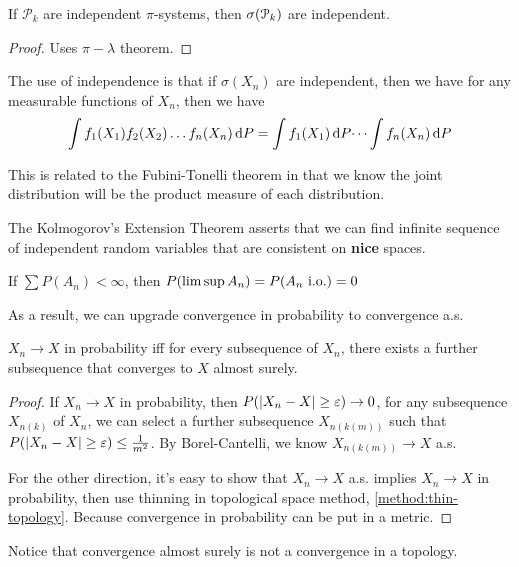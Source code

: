 \begin{thm}
    If \(\mathcal{P}_{k}\) are independent \(\pi\)-systems, then \(\sigma\pqty{\mathcal{P}_{k}}\) are independent. 
\end{thm}

\begin{proof}
    Uses \(\pi- \lambda\) theorem.
\end{proof}



The use of independence is that if \(\sigma(X_{n})\) are independent, then we have for any measurable functions of \(X_{n}\), then we have 
\begin{equation*}
    \int f_{1}\pqty{X_{1}} f_{2}\pqty{X_{2}} \dots f_{n}\pqty{X_{n}} \dd{P} = \int f_{1}\pqty{X_{1}} \dd{P} \dots \int f_{n}\pqty{X_{n}} \dd{P}
\end{equation*}

This is related to the Fubini-Tonelli theorem in that we know the joint distribution will be the product measure of each distribution.

The Kolmogorov's Extension Theorem asserts that we can find infinite sequence of independent random variables that are consistent on \textbf{nice} spaces. 



\begin{thm}
    If \(\sum P(A_{n})< \infty\), then \(P\pqty{\limsup A_{n}} = P\pqty{A_{n} \text{ i.o.}} =0 \)
\end{thm}

As a result, we can upgrade convergence in probability to convergence a.s. 

\begin{thm}
    \(X_{n} \to X\) in probability iff for every subsequence of \(X_{n}\), there exists a further subsequence that converges to \(X\) almost surely. 
\end{thm}
\begin{proof}
    If \(X_{n}\to X\) in probability, then \(P\pqty{\abs{X_{n} - X} \geq \epsilon} \to 0\), for any subsequence \(X_{n(k)}\) of \(X_{n}\), we can select a further subsequence \(X_{n(k(m))}\) such that \(P \pqty{\abs{X_{n} - X} \geq \epsilon} \leq \frac{1}{m^{2}}\). By Borel-Cantelli, we know \(X_{n(k(m))} \to X\) a.s. 

    For the other direction, it's easy to show that \(X_{n} \to X\) a.s. implies \(X_{n}\to X\) in probability, then use thinning in topological space method, \autoref{method:thin-topology}. Because convergence in probability can be put in a metric.
\end{proof}
\begin{remark}
    Notice that convergence almost surely is not a convergence in a topology. 
\end{remark}

